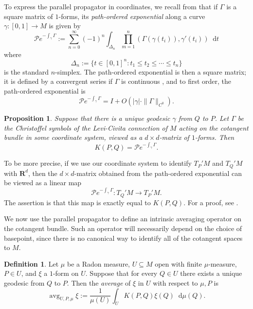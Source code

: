 \documentclass[reqno,11pt]{amsart}
\newcommand{\RR}{\mathbf{R}}
\DeclareMathOperator{\avg}{avg}
\newcommand*\dif{\mathop{}\!\mathrm{d}}
\newcommand{\dfn}[1]{\emph{#1}\index{#1}}
\newtheorem{proposition}[theorem]{Proposition}
\theoremstyle{definition}
\newtheorem{definition}[theorem]{Definition}
\numberwithin{equation}{section}
\begin{document}
To express the parallel propagator in coordinates, we recall from \cite[Chapter II, \S2]{baez1994gauge} that if $\Gamma$ is a square matrix of $1$-forms, its \dfn{path-ordered exponential} along a curve $\gamma: [0, 1] \to M$ is given by 
$$\mathcal Pe^{-\int_\gamma \Gamma} := \sum_{n=0}^\infty (-1)^n \int_{\Delta_n} \prod_{m=1}^n (\Gamma(\gamma(t_i)), \gamma'(t_i)) \dif t$$
where 
$$\Delta_n := \{t \in [0, 1]^n: t_1 \leq t_2 \leq \cdots \leq t_n\}$$
is the standard $n$-simplex.
The path-ordered exponential is then a square matrix; it is defined by a convergent series if $\Gamma$ is continuous \cite[Chapter II, \S2]{baez1994gauge}, and to first order, the path-ordered exponential is
\begin{equation}\label{path ordered exponential taylor series}
\mathcal Pe^{-\int_\gamma \Gamma} = I + O(|\gamma| \cdot \|\Gamma\|_{C^0}).
\end{equation}

\begin{proposition}
Suppose that there is a unique geodesic $\gamma$ from $Q$ to $P$.
Let $\Gamma$ be the Christoffel symbols of the Levi-Civita connection of $M$ acting on the cotangent bundle in some coordinate system, viewed as a $d \times d$-matrix of $1$-forms.
Then
\begin{equation}\label{path ordered exponential is propagator}
K(P, Q) = \mathcal Pe^{-\int_\gamma \Gamma}.
\end{equation}
\end{proposition}

To be more precise, if we use our coordinate system to identify $T_P'M$ and $T_Q'M$ with $\RR^d$, then the $d\times d$-matrix obtained from the path-ordered exponential can be viewed as a linear map
$$\mathcal Pe^{-\int_\gamma \Gamma}: T_Q'M \to T_P'M.$$
The assertion is that this map is exactly equal to $K(P, Q)$.
For a proof, see \cite[Chapter II, \S2]{baez1994gauge}.

We now use the parallel propagator to define an intrinsic averaging operator on the cotangent bundle.
Such an operator will necessarily depend on the choice of basepoint, since there is no canonical way to identify all of the cotangent spaces to $M$.

\begin{definition}
Let $\mu$ be a Radon measure, $U \subseteq M$ open with finite $\mu$-measure, $P \in U$, and $\xi$ a $1$-form on $U$.
Suppose that for every $Q \in U$ there exists a unique geodesic from $Q$ to $P$.
Then the \dfn{average} of $\xi$ in $U$ with respect to $\mu, P$ is 
$$\avg_{U, P, \mu} \xi := \frac{1}{\mu(U)} \int_U K(P, Q)\xi(Q) \dif \mu(Q).$$
\end{definition}
\end{document}
